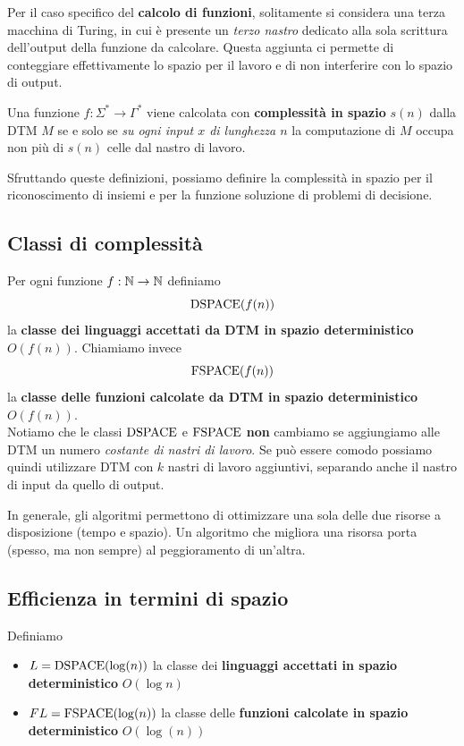 Per il caso specifico del \textbf{calcolo di funzioni}, solitamente si considera una terza macchina di Turing, in cui è presente un \textit{terzo nastro} dedicato alla sola scrittura dell'output della funzione da calcolare. Questa aggiunta ci permette di conteggiare effettivamente lo spazio per il lavoro e di non interferire con lo spazio di output. 

Una funzione $f: \Sigma^\ast \rightarrow \Gamma^\ast$ viene calcolata con \textbf{complessità in spazio} $s(n)$ dalla DTM $M$ se e solo se \textit{su ogni input $x$ di lunghezza $n$} la computazione di $M$ occupa non più di $s(n)$ celle dal nastro di lavoro.

Sfruttando queste definizioni, possiamo definire la complessità in spazio per il riconoscimento di insiemi e per la funzione soluzione di problemi di decisione.

\subsection{Classi di complessità}

Per ogni funzione $f: \mathbb{N} \rightarrow \mathbb{N}$ definiamo 
$$ \text{DSPACE} (f(n)) $$
la \textbf{classe dei linguaggi accettati da DTM in spazio deterministico} $O(f(n))$. Chiamiamo invece
$$ \text{FSPACE} (f(n)) $$
la \textbf{classe delle funzioni calcolate da DTM in spazio deterministico} $O(f(n))$.\\

Notiamo che le classi $\text{DSPACE}$ e $\text{FSPACE}$ \textbf{non} cambiamo se aggiungiamo alle DTM un numero \textit{costante di nastri di lavoro}. Se può essere comodo possiamo quindi utilizzare DTM con $k$ nastri di lavoro aggiuntivi, separando anche il nastro di input da quello di output.

In generale, gli algoritmi permettono di ottimizzare una sola delle due risorse a disposizione (tempo e spazio). Un algoritmo che migliora una risorsa porta (spesso, ma non sempre) al peggioramento di un'altra.

\subsection{Efficienza in termini di spazio}

Definiamo 
\begin{itemize}
	\item $L = \text{DSPACE} (\log (n))$ la classe dei \textbf{linguaggi accettati in spazio deterministico} $O(\log n)$
	\item $FL = \text{FSPACE} (\log (n))$ la classe delle \textbf{funzioni calcolate in spazio deterministico} $O(\log (n))$
\end{itemize}

